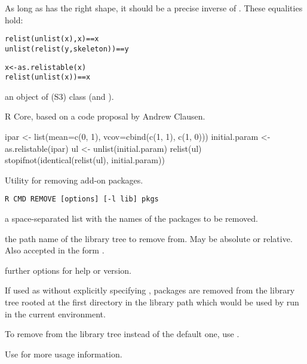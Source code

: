 \begin{Details}
As long as  has the right shape, it should be a precise inverse
of .  These equalities hold:
\begin{alltt}   relist(unlist(x), x) == x
   unlist(relist(y, skeleton)) == y

   x <- as.relistable(x)
   relist(unlist(x)) == x
\end{alltt}

\end{Details}
%
\begin{Value}
an object of (S3) class  (and ).
\end{Value}
%
\begin{Author}\relax
R Core, based on a code proposal by Andrew Clausen.
\end{Author}
%
\begin{SeeAlso}\relax
{}
\end{SeeAlso}
%
\begin{Examples}
\begin{ExampleCode}
 ipar <- list(mean=c(0, 1), vcov=cbind(c(1, 1), c(1, 0)))
 initial.param <- as.relistable(ipar)
 ul <- unlist(initial.param)
 relist(ul)
 stopifnot(identical(relist(ul), initial.param))
\end{ExampleCode}
\end{Examples}
%
\begin{Description}\relax
Utility for removing add-on packages.
\end{Description}
%
\begin{Usage}
\begin{verbatim}
R CMD REMOVE [options] [-l lib] pkgs
\end{verbatim}
\end{Usage}
%
\begin{Arguments}
\begin{ldescription}
\item[\code{pkgs}] a space-separated list with the names of the packages to
be removed.
\item[\code{lib}] the path name of the \R{} library tree to remove from.  May
be absolute or relative.  Also accepted in the form .
\item[\code{options}] further options for help or version.
\end{ldescription}
\end{Arguments}
%
\begin{Details}\relax
If used as  without explicitly specifying
, packages are removed from the library tree rooted at the
first directory in the library path which would be used by \R{} run in
the current environment.

To remove from the library tree  instead of the default
one, use .

Use  for more usage information.  
\end{Details}
